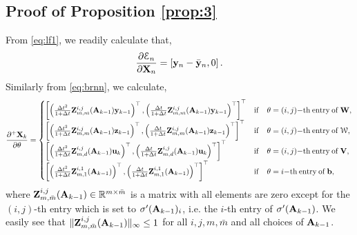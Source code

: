 \documentclass{article} \usepackage{iclr2021_conference,times}
\newcommand{\cW}{\EuScript{W}}
\newcommand{\by}{{\bf y}}
\newcommand{\bz}{{\bf z}}
\newcommand{\bW}{{\bf W}}
\newcommand{\bu}{{\bf u}}
\newcommand{\bb}{{\bf b}}
\newcommand{\bV}{{\bf V}}
\newcommand{\bA}{{\bf A}}
\newcommand{\bX}{{\bf X}}
\newcommand{\Dt}{{\Delta t}}
\newcommand{\E}{\EuScript{E}}
\begin{document}
\subsection{Proof of Proposition \ref{prop:3}}
\label{app:proof_explod}
From \eqref{eq:lf1}, we readily calculate that,
\begin{equation}
\label{eq:grad3}
 \frac{\partial \E_n}{\partial \bX_n} = \left[\by_n - \bar{\by}_n, 0 \right].
 \end{equation}
Similarly from \eqref{eq:brnn}, we calculate,
\begin{equation}
\label{eq:grad4}
\frac{\partial^{+} \bX_k}{\partial \theta} = \begin{cases} 
  \left[\left(\frac{\Dt^2}{1+ \Dt}{\bf Z}_{m,m}^{i,j}(\bA_{k-1}) \by_{k-1}\right)^\top, \left(\frac{\Dt}{1+ \Dt}{\bf Z}_{m,m}^{i,j}(\bA_{k-1}) \by_{k-1}\right)^\top\right]^\top&{\rm if}\quad \theta = (i,j){\rm -th} \> {\rm entry} \> {\rm of} \> \bW, \\
    \left[\left(\frac{\Dt^2}{1+ \Dt}{\bf Z}_{m,m}^{i,j}(\bA_{k-1}) \bz_{k-1}\right)^\top, \left(\frac{\Dt}{1+ \Dt}{\bf Z}_{m,m}^{i,j}(\bA_{k-1}) \bz_{k-1}\right)^\top\right]^\top&{\rm if}\quad \theta = (i,j){\rm -th} \> {\rm entry} \> {\rm of} \> {\bf \cW}, \\
    \left[\left(\frac{\Dt^2}{1+ \Dt}{\bf Z}_{m,d}^{i,j}(\bA_{k-1}) \bu_{k}\right)^\top, \left(\frac{\Dt}{1+ \Dt}{\bf Z}_{m,d}^{i,j}(\bA_{k-1}) \bu_{k}\right)^\top\right]^\top&{\rm if}\quad \theta = (i,j){\rm -th} \> {\rm entry} \> {\rm of} \> \bV, \\
  \left[\left(\frac{\Dt^2}{1+ \Dt}{\bf Z}_{m,1}^{i,1}(\bA_{k-1}) \right)^\top, \left(\frac{\Dt}{1+ \Dt}{\bf Z}_{m,1}^{i,1}(\bA_{k-1}) \right)^\top\right]^\top&{\rm if}\quad \theta = i{\rm -th} \> {\rm entry} \> {\rm of} \> \bb,
\end{cases} 
\end{equation}
where ${\bf Z}_{m,\bar{m}}^{i,j}(\bA_{k-1}) \in \mathbb{R}^{m \times \bar{m}}$ is a matrix with all elements are zero except for the $(i,j)$-th entry which is set to $\sigma^{\prime}(\bA_{k-1})_i$, i.e. the $i$-th entry of $\sigma^{\prime}(\bA_{k-1})$. We easily see that $\|{\bf Z}^{i,j}_{m,\bar{m}}(\bA_{k-1})\|_\infty \leq 1$ for all $i,j,m,\bar{m}$ and all choices of $\bA_{k-1}$. 
\end{document}
